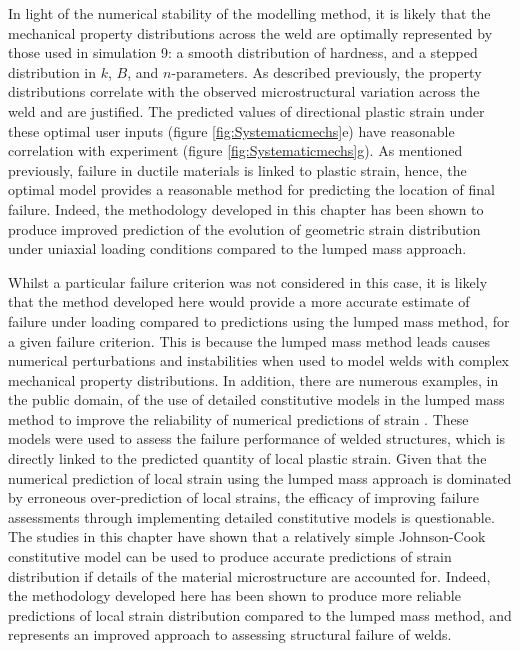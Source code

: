 In light of the numerical stability of the modelling method, it is likely that the mechanical property distributions across the weld are optimally represented by those used in simulation 9: a smooth distribution of hardness, and a stepped distribution in $k$, $B$, and $n$-parameters. As described previously, the property distributions correlate with the observed microstructural variation across the weld and are justified. The predicted values of directional plastic strain under these optimal user inputs (figure \ref{fig:Systematicmechs}e) have reasonable correlation with experiment (figure \ref{fig:Systematicmechs}g). As mentioned previously, failure in ductile materials is linked to plastic strain, hence, the optimal model provides a reasonable method for predicting the location of final failure. Indeed, the methodology developed in this chapter has been shown to produce improved prediction of the evolution of geometric strain distribution under uniaxial loading conditions compared to the lumped mass approach.

Whilst a particular failure criterion was not considered in this case, it is likely that the method developed here would provide a more accurate estimate of failure under loading compared to predictions using the lumped mass method, for a given failure criterion. This is because the lumped mass method leads causes numerical perturbations and instabilities when used to model welds with complex mechanical property distributions. In addition, there are numerous examples, in the public domain, of the use of detailed constitutive models in the lumped mass method to improve the reliability of numerical predictions of strain \cite{Kim2010,Kim2010a,Reis2004}. These models were used to assess the failure performance of welded structures, which is directly linked to the predicted quantity of local plastic strain. Given that the numerical prediction of local strain using the lumped mass approach is dominated by erroneous over-prediction of local strains, the efficacy of improving failure assessments through implementing detailed constitutive models is questionable. The studies in this chapter have shown that a relatively simple Johnson-Cook constitutive model can be used to produce accurate predictions of strain distribution if details of the material microstructure are accounted for. Indeed, the methodology developed here has been shown to produce more reliable predictions of local strain distribution compared to the lumped mass method, and represents an improved approach to assessing structural failure of welds.


